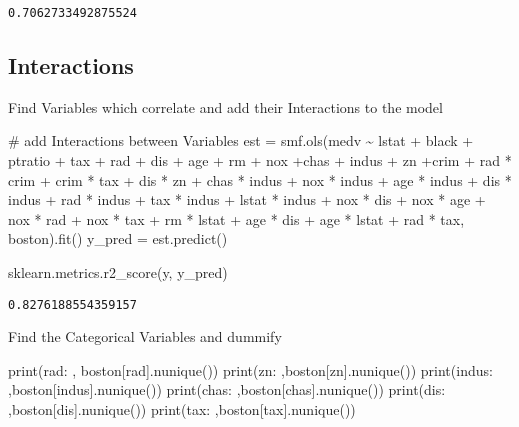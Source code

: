 \documentclass[
  letterpaper,
  DIV=11,
  numbers=noendperiod]{scrreprt}
\newenvironment{Shaded}{\begin{snugshade}}{\end{snugshade}}
\newcommand{\BuiltInTok}[1]{\textcolor[rgb]{0.00,0.23,0.31}{#1}}
\newcommand{\CommentTok}[1]{\textcolor[rgb]{0.37,0.37,0.37}{#1}}
\newcommand{\NormalTok}[1]{\textcolor[rgb]{0.00,0.23,0.31}{#1}}
\newcommand{\OperatorTok}[1]{\textcolor[rgb]{0.37,0.37,0.37}{#1}}
\newcommand{\StringTok}[1]{\textcolor[rgb]{0.13,0.47,0.30}{#1}}
\begin{document}
\begin{verbatim}
0.7062733492875524
\end{verbatim}

\hypertarget{interactions-1}{%
\subsection{Interactions}\label{interactions-1}}

Find Variables which correlate and add their Interactions to the model

\begin{Shaded}
\begin{Highlighting}[]
\CommentTok{\# add Interactions between Variables}
\NormalTok{est }\OperatorTok{=}\NormalTok{ smf.ols(}\StringTok{\textquotesingle{}medv \textasciitilde{} lstat + black + ptratio + tax + rad + dis + age + rm + nox +chas + indus + zn +crim + rad * crim + crim * tax + dis * zn + chas * indus + nox * indus + age * indus + dis * indus + rad * indus + tax * indus + lstat * indus + nox * dis + nox * age + nox * rad + nox * tax + rm * lstat + age * dis + age * lstat + rad * tax\textquotesingle{}}\NormalTok{, boston).fit()}
\NormalTok{y\_pred }\OperatorTok{=}\NormalTok{ est.predict()}

\NormalTok{sklearn.metrics.r2\_score(y, y\_pred)}
\end{Highlighting}
\end{Shaded}

\begin{verbatim}
0.8276188554359157
\end{verbatim}

Find the Categorical Variables and dummify

\begin{Shaded}
\begin{Highlighting}[]
\BuiltInTok{print}\NormalTok{(}\StringTok{\textquotesingle{}rad: \textquotesingle{}}\NormalTok{ , boston[}\StringTok{\textquotesingle{}rad\textquotesingle{}}\NormalTok{].nunique())}
\BuiltInTok{print}\NormalTok{(}\StringTok{\textquotesingle{}zn: \textquotesingle{}}\NormalTok{ ,boston[}\StringTok{\textquotesingle{}zn\textquotesingle{}}\NormalTok{].nunique())}
\BuiltInTok{print}\NormalTok{(}\StringTok{\textquotesingle{}indus: \textquotesingle{}}\NormalTok{ ,boston[}\StringTok{\textquotesingle{}indus\textquotesingle{}}\NormalTok{].nunique())}
\BuiltInTok{print}\NormalTok{(}\StringTok{\textquotesingle{}chas: \textquotesingle{}}\NormalTok{ ,boston[}\StringTok{\textquotesingle{}chas\textquotesingle{}}\NormalTok{].nunique())}
\BuiltInTok{print}\NormalTok{(}\StringTok{\textquotesingle{}dis: \textquotesingle{}}\NormalTok{ ,boston[}\StringTok{\textquotesingle{}dis\textquotesingle{}}\NormalTok{].nunique())}
\BuiltInTok{print}\NormalTok{(}\StringTok{\textquotesingle{}tax: \textquotesingle{}}\NormalTok{ ,boston[}\StringTok{\textquotesingle{}tax\textquotesingle{}}\NormalTok{].nunique())}
\end{Highlighting}
\end{Shaded}
\end{document}
